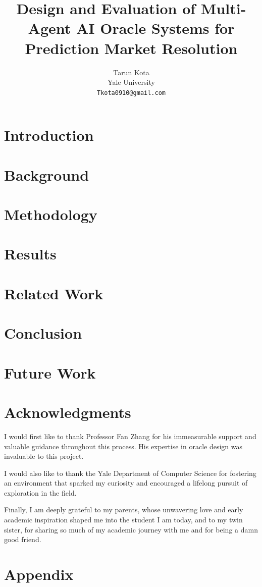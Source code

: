 \documentclass[11pt]{article}
\title{\textbf{Design and Evaluation of Multi-Agent AI Oracle Systems for Prediction Market Resolution}}
\author{
Tarun Kota \\
Yale University \\
\texttt{Tkota0910@gmail.com}
}
\date{}
\begin{document}
\maketitle

\begin{abstract}

\end{abstract}

\section{Introduction}


\section{Background}


\section{Methodology}
\label{methodology}


\section{Results}


\section{Related Work}


\section{Conclusion}


\section{Future Work}


\section*{Acknowledgments}

I would first like to thank Professor Fan Zhang for his immeasurable support and valuable guidance throughout this process. His expertise in oracle design was invaluable to this project.

I would also like to thank the Yale Department of Computer Science for fostering an environment that sparked my curiosity and encouraged a lifelong pursuit of exploration in the field.

Finally, I am deeply grateful to my parents, whose unwavering love and early academic inspiration shaped me into the student I am today, and to my twin sister, for sharing so much of my academic journey with me and for being a damn good friend.

\printbibliography

\appendix
\section{Appendix}

\end{document}
